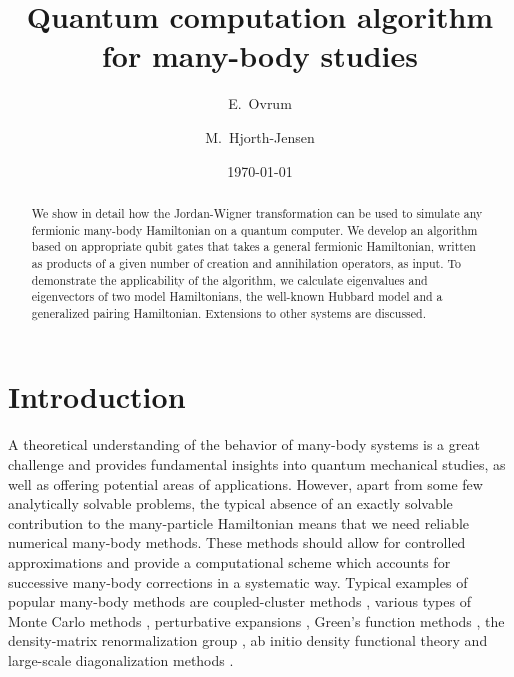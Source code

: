 \documentclass[aps,pra,twocolumn,floatfix]{revtex4}
\begin{document}
\title{Quantum computation algorithm for many-body studies}
\author{E.~Ovrum}
\author{M.~Hjorth-Jensen}
\date{\today}
\begin{abstract}
We show in detail how the Jordan-Wigner transformation can be  used to
simulate any fermionic many-body Hamiltonian on a quantum computer.
We develop an algorithm based on appropriate qubit gates that 
takes a general fermionic Hamiltonian, written as products of
a given number of creation and annihilation operators, as input.
To demonstrate the  applicability  of the algorithm, we calculate 
eigenvalues and eigenvectors of two model Hamiltonians, the
well-known
 Hubbard model and a generalized pairing Hamiltonian.  
Extensions to other systems are discussed.  
\end{abstract}

\maketitle


\section{Introduction}

A theoretical understanding of the behavior of many-body systems
is a  great challenge and provides fundamental insights into quantum 
mechanical studies, as well
as offering potential areas of applications.
However, apart from some few analytically solvable problems,
the typical absence of an exactly solvable contribution to the
many-particle
 Hamiltonian
means that we need reliable numerical many-body methods.
These methods should allow for controlled approximations
and provide a computational scheme which accounts for successive
many-body corrections in a systematic way.
Typical examples of
popular many-body methods are coupled-cluster methods
\cite{bartlett81,helgaker,Dean2004},
various types of
Monte Carlo methods \cite{Pudliner1997,kdl97,ceperley1995},
perturbative expansions \cite{lindgren,mhj95},
Green's function methods \cite{dickhoff,blaizot},
the density-matrix renormalization group \cite{white1992,schollwock2005},
ab initio density functional theory
\cite{bartlett2005,peirs2003,vanneck2006}
and large-scale diagonalization methods
\cite{Whitehead1977,caurier2005,navratil2004,horoi2006}. 
\end{document}

